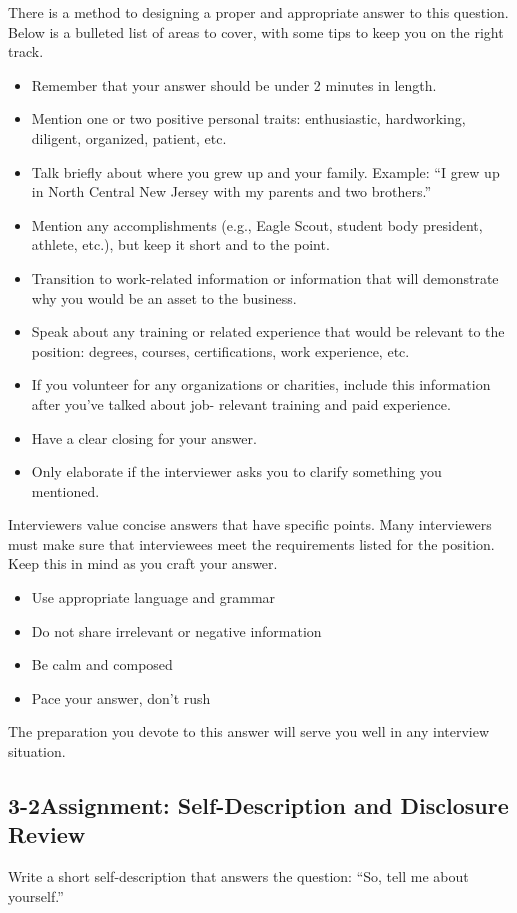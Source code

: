 There is a method to designing a proper and appropriate answer to this question. Below is a bulleted list of areas to cover, with some tips to keep you on the right track.
\begin{itemize}[leftmargin=*]
\item Remember that your answer should be under 2 minutes in length.
\item Mention one or two positive personal traits: enthusiastic, hardworking, diligent, organized, patient, etc.
\item Talk briefly about where you grew up and your family. Example: ``I grew up in North Central New Jersey with my parents and two brothers.''
\item Mention any accomplishments (e.g., Eagle Scout, student body president, athlete, etc.), but keep it short and to the point.
\item Transition to work-related information or information that will demonstrate why you would be an asset to the business.
\item Speak about any training or related experience that would be relevant to the position: degrees, courses, certifications, work experience, etc.
\item If you volunteer for any organizations or charities, include this information after you've talked about job- relevant training and paid experience.
\item Have a clear closing for your answer.
\item Only elaborate if the interviewer asks you to clarify something you mentioned.
\end{itemize}
Interviewers value concise answers that have specific points. Many interviewers must make sure that interviewees meet the requirements listed for the position. Keep this in mind as you craft your answer.
\begin{itemize}[leftmargin=*]
\item Use appropriate language and grammar
\item Do not share irrelevant or negative information
\item Be calm and composed
\item Pace your answer, don't rush
\end{itemize}
The preparation you devote to this answer will serve you well in any interview situation.
 
\pagebreak \subsection*{3-2\quad Assignment: Self-Description and Disclosure Review}
Write a short self-description that answers the question: ``So, tell me about yourself.''

